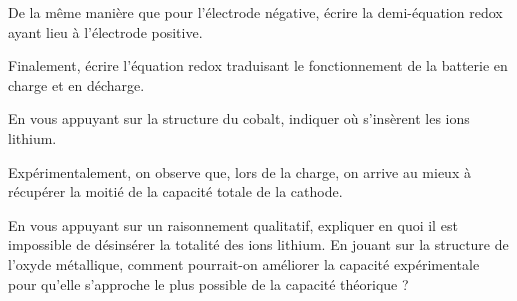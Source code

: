 \Q De la même manière que pour l'électrode négative, écrire la demi-équation redox ayant lieu à l'électrode positive.

\Q \label{Q:09-06} Finalement, écrire l'équation redox traduisant le fonctionnement de la batterie en charge et en décharge.


\Q En vous appuyant sur la structure du cobalt, indiquer où s'insèrent les ions lithium.


Expérimentalement, on observe que, lors de la charge, on arrive au mieux à récupérer la moitié de la capacité totale de la cathode.

\Q En vous appuyant sur un raisonnement qualitatif, expliquer en quoi il est impossible de désinsérer la totalité des ions lithium. En jouant sur la structure de l'oxyde métallique, comment pourrait-on améliorer la capacité expérimentale pour qu'elle s'approche le plus possible de la capacité théorique ?


